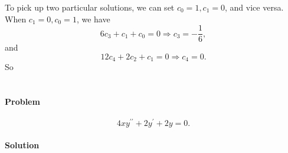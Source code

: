 \documentclass[hyperref, a4paper]{article}
\begin{document}
To pick up two particular solutions, we can set $c_0 = 1, c_1 = 0$, and vice versa. 
When $c_1 = 0, c_0 = 1$, we have 
\[
    6 c_3 + c_1 + c_0 = 0 \Rightarrow c_3 = - \frac{1}{6},
\]
and 
\[
    12 c_4 + 2 c_2 + c_1 = 0 \Rightarrow c_4 = 0.
\]
So 

\section{}

\paragraph*{Problem} \begin{equation}
    4 x y^{\prime \prime}+2 y^{\prime}+2 y=0.
\end{equation}

\paragraph*{Solution} 
\end{document}
